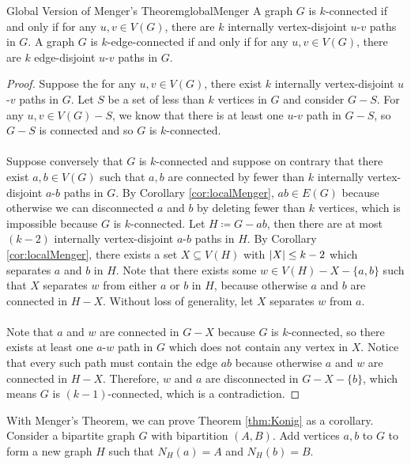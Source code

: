 \documentclass[math, code]{amznotes}
\theoremstyle{remark}
\begin{document}
\begin{corbox}{Global Version of Menger's Theorem}{globalMenger}
    A graph $G$ is $k$-connected if and only if for any $u, v \in V(G)$, there are $k$ internally vertex-disjoint $u$-$v$ paths in $G$. A graph $G$ is $k$-edge-connected if and only if for any $u, v \in V(G)$, there are $k$ edge-disjoint $u$-$v$ paths in $G$. 
    \tcblower
    \begin{proof}
        Suppose the for any $u, v \in V(G)$, there exist $k$ internally vertex-disjoint $u$-$v$ paths in $G$. Let $S$ be a set of less than $k$ vertices in $G$ and consider $G - S$. For any $u, v \in V(G) - S$, we know that there is at least one $u$-$v$ path in $G - S$, so $G - S$ is connected and so $G$ is $k$-connected.
        \\\\
        Suppose conversely that $G$ is $k$-connected and suppose on contrary that there exist $a, b \in V(G)$ such that $a, b$ are connected by fewer than $k$ internally vertex-disjoint $a$-$b$ paths in $G$. By Corollary \ref{cor:localMenger}, $ab \in E(G)$ because otherwise we can disconnected $a$ and $b$ by deleting fewer than $k$ vertices, which is impossible because $G$ is $k$-connected. Let $H \coloneqq G - ab$, then there are at most $(k - 2)$ internally vertex-disjoint $a$-$b$ paths in $H$. By Corollary \ref{cor:localMenger}, there exists a set $X \subseteq V(H)$ with ${\left\lvert {X} \right\rvert} \leq k - 2$ which separates $a$ and $b$ in $H$. Note that there exists some $w \in V(H) - X - \{a, b\}$ such that $X$ separates $w$ from either $a$ or $b$ in $H$, because otherwise $a$ and $b$ are connected in $H - X$. Without loss of generality, let $X$ separates $w$ from $a$. 
        \\\\
        Note that $a$ and $w$ are connected in $G - X$ because $G$ is $k$-connected, so there exists at least one $a$-$w$ path in $G$ which does not contain any vertex in $X$. Notice that every such path must contain the edge $ab$ because otherwise $a$ and $w$ are connected in $H - X$. Therefore, $w$ and $a$ are disconnected in $G - X - \{b\}$, which means $G$ is $(k - 1)$-connected, which is a contradiction.
    \end{proof}
\end{corbox}
With Menger's Theorem, we can prove Theorem \ref{thm:Konig} as a corollary. Consider a bipartite graph $G$ with bipartition $(A, B)$. Add vertices $a, b$ to $G$ to form a new graph $H$ such that $N_H(a) = A$ and $N_H(b) = B$.
\end{document}

